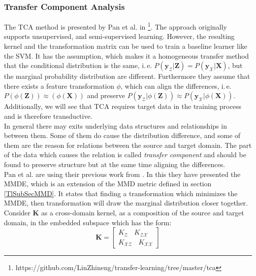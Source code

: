 \subsubsection{Transfer Component Analysis}
The \acs{TCA} method is presented by Pan et al. in \cite{Pan.2011}\footnote{https://github.com/LinZhineng/transfer-learning/tree/master/tca}.
The approach originally supports unsupervised, and semi-supervised learning.
However, the resulting kernel and the transformation matrix can be used to train a baseline learner like the \acs{SVM}.
It has the assumption, which makes it a homogeneous transfer method that the conditional distribution is the same, i.\,e. $ P(\mathbf{y}_\mathcal{Z}\vert \mathbf{Z}) = P(\mathbf{y}_\mathcal{X}\vert \mathbf{X})$, but the marginal probability distribution are different.
Furthermore they assume that there exists a feature transformation $\phi$, which can align the differences, i.\,e. $P(\phi(\mathbf{Z})) \approx(\phi(\mathbf{X}))$ and preserve $P(\mathbf{y}_\mathcal{Z}\vert \phi(\mathbf{Z}))\approx P(\mathbf{y}_\mathcal{X}\vert \phi(\mathbf{X}))$.\cite{Pan.2011}\\
Additionally, we will see that \acs{TCA} requires target data in the training process and is therefore transductive.\\
In general there may exits underlying data structures and relationships in between them.
Some of them do cause the distribution difference, and some of them are the reason for relations between the source and target domain.
The part of the data which causes the relation is called \textit{transfer component} and should be found to preserve structure but at the same time aligning the differences.\cite{Pan.2011}\\
Pan et al. are using their previous work from \cite{Pan.2008}.
In this they have presented the \ac{MMDE}, which is an extension of the \acs{MMD} metric defined in section \ref{TlSubSecMMD}.
It states that finding a transformation which minimizes the \acs{MMDE}, then transformation will draw the marginal distribution closer together.\\
Consider $\mathbf{K}$ as a cross-domain kernel, as a composition of the source and target domain, in the embedded subspace which has the form:\cite{Pan.2011}
\begin{equation}\label{EqTCAKernel}
\mathbf{K} = 
	\begin{bmatrix}
	K_{\mathcal{Z}}\>\>\>\> K_{\mathcal{ZX}} \\
	K_{\mathcal{XZ}}\>\>\>\> K_{\mathcal{XX}}
	\end{bmatrix}
\end{equation}
